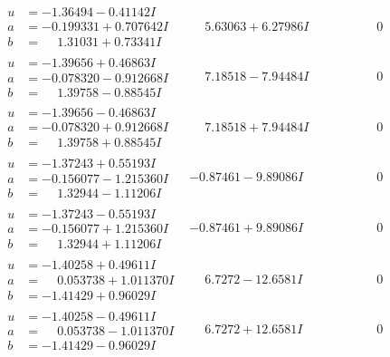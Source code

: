 \documentclass[1p]{elsarticle_modified}
\theoremstyle{definition}
\begin{document}
$$\begin{array}{c|c|c}
\begin{aligned}
u &= -1.36494 - 0.41142 I \\
a &= -0.199331 + 0.707642 I \\
b &= \phantom{-}1.31031 + 0.73341 I\end{aligned}
 & \phantom{-}5.63063 + 6.27986 I & \phantom{-0.000000 } 0 \\ \hline\begin{aligned}
u &= -1.39656 + 0.46863 I \\
a &= -0.078320 - 0.912668 I \\
b &= \phantom{-}1.39758 - 0.88545 I\end{aligned}
 & \phantom{-}7.18518 - 7.94484 I & \phantom{-0.000000 } 0 \\ \hline\begin{aligned}
u &= -1.39656 - 0.46863 I \\
a &= -0.078320 + 0.912668 I \\
b &= \phantom{-}1.39758 + 0.88545 I\end{aligned}
 & \phantom{-}7.18518 + 7.94484 I & \phantom{-0.000000 } 0 \\ \hline\begin{aligned}
u &= -1.37243 + 0.55193 I \\
a &= -0.156077 - 1.215360 I \\
b &= \phantom{-}1.32944 - 1.11206 I\end{aligned}
 & -0.87461 - 9.89086 I & \phantom{-0.000000 } 0 \\ \hline\begin{aligned}
u &= -1.37243 - 0.55193 I \\
a &= -0.156077 + 1.215360 I \\
b &= \phantom{-}1.32944 + 1.11206 I\end{aligned}
 & -0.87461 + 9.89086 I & \phantom{-0.000000 } 0 \\ \hline\begin{aligned}
u &= -1.40258 + 0.49611 I \\
a &= \phantom{-}0.053738 + 1.011370 I \\
b &= -1.41429 + 0.96029 I\end{aligned}
 & \phantom{-}6.7272 - 12.6581 I & \phantom{-0.000000 } 0 \\ \hline\begin{aligned}
u &= -1.40258 - 0.49611 I \\
a &= \phantom{-}0.053738 - 1.011370 I \\
b &= -1.41429 - 0.96029 I\end{aligned}
 & \phantom{-}6.7272 + 12.6581 I & \phantom{-0.000000 } 0\\

\end{array}$$
\end{document}
